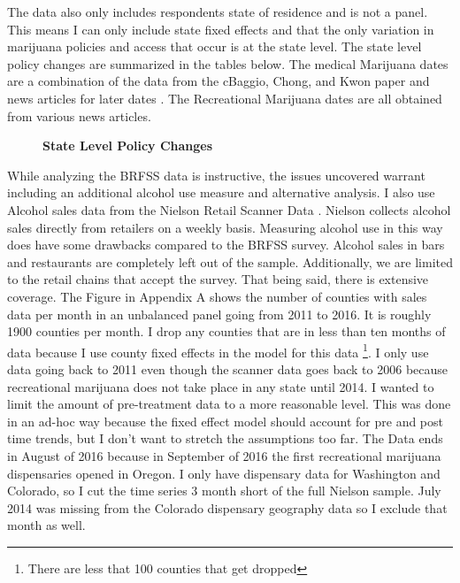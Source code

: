 \documentclass[11pt]{article}
\begin{document}
  The data also only includes respondents state of residence and is not a panel. This means I can only include state fixed effects and that the only variation in marijuana policies and access that occur is at the state level. The state level policy changes are summarized in the tables below. The medical Marijuana dates are a combination of the data from the cBaggio, Chong, and Kwon paper and news articles for later dates \cite{baggio_chong_kwon_2018}. The Recreational Marijuana dates are all obtained from various news articles.  \par

\begin{figure}[H]
	\centering
	\Large{\textbf{State Level Policy Changes}}\par\medskip
	\scalebox{.6}{
		
	}
	\scalebox{.6}{
		
	}
\end{figure}

While analyzing the BRFSS data is instructive, the issues uncovered warrant including an additional alcohol use measure and alternative analysis.  I also use Alcohol sales data from the Nielson Retail Scanner Data . Nielson collects alcohol sales directly from retailers on a weekly basis. Measuring alcohol use in this way does have some drawbacks compared to the BRFSS survey. Alcohol sales in bars and restaurants are completely left out of the sample. Additionally, we are limited to the retail chains that accept the survey. That being said, there is extensive coverage. The Figure in Appendix A shows the number of counties with sales data per month in an unbalanced panel going from 2011 to 2016. It is roughly 1900 counties per month. I drop any counties that are in less than ten months of data because I use county fixed effects in the model for this data \footnote{There are less that 100 counties that get dropped}. I only use data going back to 2011 even though the scanner data goes back to 2006 because recreational marijuana does not take place in any state until 2014. I wanted to limit the amount of pre-treatment data to a more reasonable level. This was done in an ad-hoc way because the fixed effect model should account for pre and post time trends, but I don't want to stretch the assumptions too far. The Data ends in August of 2016 because in September of 2016 the first recreational marijuana dispensaries opened in Oregon. I only have dispensary data for Washington and Colorado, so I cut the time series 3 month short of the full Nielson sample. July 2014 was missing from the Colorado dispensary geography data so I exclude that month as well. \par
\end{document}
